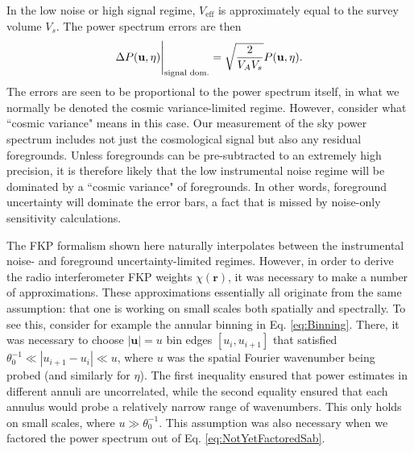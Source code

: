 \documentclass[twocolumn,aps,prd,nofootinbib,showpacs]{revtex4-1}
\begin{document}
 In the low noise or high signal regime, $V_\textrm{eff}$ is approximately equal to the survey volume $V_s$.  The power spectrum errors are then
 \begin{equation}
 \Delta P(\mathbf{u}, \eta) \Bigg{|}_\textrm{signal dom.} = \sqrt{\frac{2}{V_A V_s}} P(\mathbf{u}, \eta).
 \end{equation}
 The errors are seen to be proportional to the power spectrum itself, in what we normally be denoted the cosmic variance-limited regime.  However, consider what ``cosmic variance" means in this case.  Our measurement of the sky power spectrum includes not just the cosmological signal but also any residual foregrounds.  Unless foregrounds can be pre-subtracted to an extremely high precision, it is therefore likely that the low instrumental noise regime will be dominated by a ``cosmic variance" of foregrounds.  In other words, foreground uncertainty will dominate the error bars, a fact that is missed by noise-only sensitivity calculations.

The FKP formalism shown here naturally interpolates between the instrumental noise- and foreground uncertainty-limited regimes.  However, in order to derive the radio interferometer FKP weights $\chi(\mathbf{r})$, it was necessary to make a number of approximations.  These approximations essentially all originate from the same assumption: that one is working on small scales both spatially and spectrally.  To see this, consider for example the annular binning in Eq. \eqref{eq:Binning}.  There, it was necessary to choose $|\mathbf{u}| = u$ bin edges $[u_i, u_{i+1}]$ that satisfied $\theta_0^{-1} \ll |u_{i+1} - u_i | \ll u $, where $u$ was the spatial Fourier wavenumber being probed (and similarly for $\eta$).  The first inequality ensured that power estimates in different annuli are uncorrelated, while the second equality ensured that each annulus would probe a relatively narrow range of wavenumbers.  This only holds on small scales, where $u \gg \theta_0^{-1}$.  This assumption was also necessary when we factored the power spectrum out of Eq. \eqref{eq:NotYetFactoredSab}.
\end{document}
